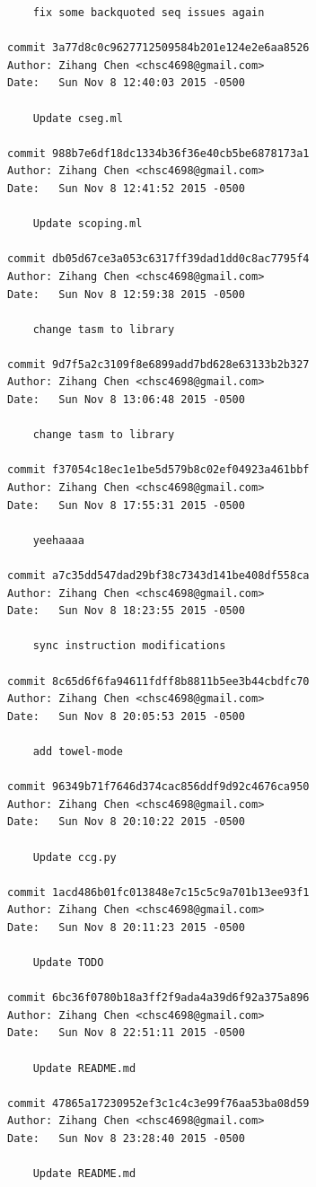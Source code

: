 \documentclass{report}
\begin{document}
\begin{appendices}
\begin{verbatim}
    fix some backquoted seq issues again

commit 3a77d8c0c9627712509584b201e124e2e6aa8526
Author: Zihang Chen <chsc4698@gmail.com>
Date:   Sun Nov 8 12:40:03 2015 -0500

    Update cseg.ml

commit 988b7e6df18dc1334b36f36e40cb5be6878173a1
Author: Zihang Chen <chsc4698@gmail.com>
Date:   Sun Nov 8 12:41:52 2015 -0500

    Update scoping.ml

commit db05d67ce3a053c6317ff39dad1dd0c8ac7795f4
Author: Zihang Chen <chsc4698@gmail.com>
Date:   Sun Nov 8 12:59:38 2015 -0500

    change tasm to library

commit 9d7f5a2c3109f8e6899add7bd628e63133b2b327
Author: Zihang Chen <chsc4698@gmail.com>
Date:   Sun Nov 8 13:06:48 2015 -0500

    change tasm to library

commit f37054c18ec1e1be5d579b8c02ef04923a461bbf
Author: Zihang Chen <chsc4698@gmail.com>
Date:   Sun Nov 8 17:55:31 2015 -0500

    yeehaaaa

commit a7c35dd547dad29bf38c7343d141be408df558ca
Author: Zihang Chen <chsc4698@gmail.com>
Date:   Sun Nov 8 18:23:55 2015 -0500

    sync instruction modifications

commit 8c65d6f6fa94611fdff8b8811b5ee3b44cbdfc70
Author: Zihang Chen <chsc4698@gmail.com>
Date:   Sun Nov 8 20:05:53 2015 -0500

    add towel-mode

commit 96349b71f7646d374cac856ddf9d92c4676ca950
Author: Zihang Chen <chsc4698@gmail.com>
Date:   Sun Nov 8 20:10:22 2015 -0500

    Update ccg.py

commit 1acd486b01fc013848e7c15c5c9a701b13ee93f1
Author: Zihang Chen <chsc4698@gmail.com>
Date:   Sun Nov 8 20:11:23 2015 -0500

    Update TODO

commit 6bc36f0780b18a3ff2f9ada4a39d6f92a375a896
Author: Zihang Chen <chsc4698@gmail.com>
Date:   Sun Nov 8 22:51:11 2015 -0500

    Update README.md

commit 47865a17230952ef3c1c4c3e99f76aa53ba08d59
Author: Zihang Chen <chsc4698@gmail.com>
Date:   Sun Nov 8 23:28:40 2015 -0500

    Update README.md


\end{verbatim}
\end{appendices}
\end{document}
